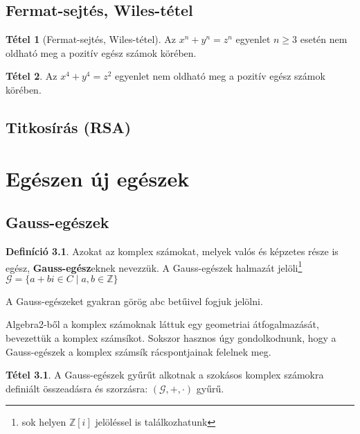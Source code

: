 \documentclass[12pt]{book}
\theoremstyle{plain} %
\theoremstyle{definition} %
\newtheorem{defi/}{Definíció}[section]
\newenvironment{defi}
  {\renewcommand{\qedsymbol}{$\clubsuit$}%
   \pushQED{\qed}\begin{defi/}}
  {\popQED\end{defi/}}
\newtheorem{theo/}{Tétel}[section]
\newenvironment{theo}
  {\renewcommand{\qedsymbol}{$\clubsuit$}%
   \pushQED{\qed}\begin{theo/}}
  {\popQED\end{theo/}}
\theoremstyle{remark}
\renewcommand\qedsymbol{$\blacksquare$}
\numberwithin{equation}{section}  %
\def\Z{\mathbb{Z}}
\begin{document}
	\section{Fermat-sejtés, Wiles-tétel}
	
	\begin{theo}[Fermat-sejtés, Wiles-tétel]
		Az $x^n+y^n=z^n$ egyenlet $n\geq3$ esetén nem oldható meg a pozitív egész számok körében.
	\end{theo}

	\begin{theo}
		Az $x^4+y^4=z^2$ egyenlet nem oldható meg a pozitív egész számok körében.
	\end{theo}
	
	\section{Titkosírás (RSA)}
	
	\chapter{Egészen új egészek}
	\section{Gauss-egészek}
	
	\begin{defi}
		Azokat az komplex számokat, melyek valós és képzetes része is egész, \textbf{Gauss-egész}eknek nevezzük. A Gauss-egészek halmazát jelöli\footnote{sok helyen $\Z[i]$ jelöléssel is találkozhatunk} $\mathcal{G}=\{ a+bi\in C \mid a,b\in \Z  \}$
	\end{defi}

	A Gauss-egészeket gyakran görög abc betűivel fogjuk jelölni.
	
	Algebra2-ből a komplex számoknak láttuk egy geometriai átfogalmazását, bevezettük a komplex számsíkot. Sokszor hasznos úgy gondolkodnunk, hogy a Gauss-egészek a komplex számsík rácspontjainak felelnek meg.

	\begin{theo}
		A Gauss-egészek gyűrűt alkotnak a szokásos komplex számokra definiált összeadásra és szorzásra: $(\mathcal{G},+,\cdot)$ gyűrű.
	\end{theo}
\end{document}
